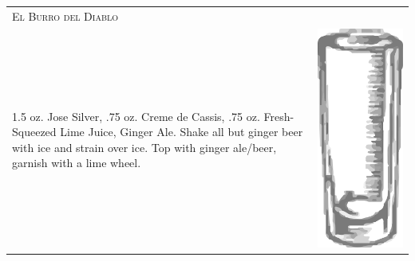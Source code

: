 \documentclass{article}
\begin{document}
\begin{tabular}{p{2in} p{0.5in}}
\multicolumn{2}{p{3in}}{\centering\Huge\textsc{El Burro del Diablo}} \\ 
  \vspace{-0.1in}1.5 oz. Jose Silver, .75 oz. Creme de Cassis, .75 oz. Fresh-Squeezed Lime Juice, Ginger Ale. Shake all but ginger beer with ice and strain over ice. Top with ginger ale/beer, garnish with a lime wheel. &
  \vspace{-0.1in} \includegraphics{collins.png}
\end{tabular}
\end{document}
